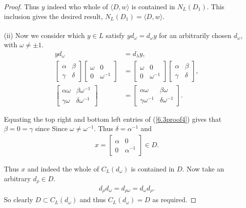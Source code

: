 \documentclass[a4paper , 11pt]{book}
\theoremstyle{definition}
\theoremstyle{remark}
\begin{document}
\begin{proof}
Thus $y$ indeed who whole of $\langle D , w \rangle$ is contained in $N_L(D_1)$. This inclusion gives the desired result, $N_L(D_1) = \langle D , w \rangle$. \\
\\
(ii) Now we consider which $y \in L$ satisfy $y d_\omega = d_\omega y$ for an arbitrarily chosen $d_\omega$, with $\omega \neq \pm 1$.
\begin{align}\label{6.3proof4} y d_ \omega &= d_\lambda y, \nonumber \\[1.5ex]
\begin{bmatrix} \alpha & \beta \\ \gamma & \delta \end{bmatrix} \begin{bmatrix} \omega & 0 \\ 0 & \omega^{-1} \end{bmatrix} &= \begin{bmatrix} \omega & 0 \\ 0 & \omega^{-1} \end{bmatrix} \begin{bmatrix} \alpha & \beta \\ \gamma & \delta \end{bmatrix}, \nonumber \\[1.5ex]
\begin{bmatrix} \alpha \omega & \beta \omega^{-1} \\ \gamma \omega & \delta \omega^{-1} \end{bmatrix} &= \begin{bmatrix} \alpha \omega & \beta \omega \\ \gamma \omega^{-1} & \delta \omega^{-1} \end{bmatrix}.
\end{align}

Equating the top right and bottom left entries of (\ref{6.3proof4}) gives that $\beta = 0 = \gamma$ since Since $\omega \neq \omega^{-1}$. Thus $\delta = \alpha^{-1}$ and 
\begin{align*} x = \begin{bmatrix} \alpha & 0 \\ 0 & \alpha^{-1} \end{bmatrix} \in D. 
\end{align*}

Thus $x$ and indeed the whole of $C_L(d_\omega)$ is contained in $D$. Now take an arbitrary $d_\rho \in D$.
\begin{align*} d_\rho d_\omega = d_{\rho \omega} = d_\omega d_\rho.
\end{align*}
So clearly $D \subset C_L(d_\omega)$ and thus $C_L(d_\omega) = D$ as required.
\end{proof}
\end{document}
